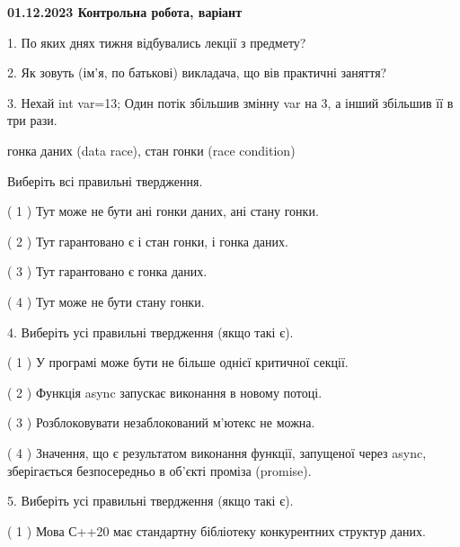 \documentclass[12pt, ukrainian]{article}
\begin{document}
\vspace{4mm}
\newpage
\begin {large}

\textbf{01.12.2023 Контрольна робота, варіант  }\par


{
1. По яких днях тижня відбувались лекції з предмету?



\vspace{5mm}
2. Як зовуть (ім'я, по батькові) викладача, що вів практичні заняття?



\vspace{5mm}
3. Нехай int var=13; Один потік збільшив змінну var на 3, а інший збільшив її в три рази.

гонка даних (data race), стан гонки (race condition)

Виберіть всі правильні твердження.\par
\vspace{2mm}
( 1 ) Тут може не бути ані гонки даних, ані стану гонки.%

( 2 ) Тут гарантовано є і стан гонки, і гонка даних.%

( 3 ) Тут гарантовано є гонка даних.%

( 4 ) Тут може не бути стану гонки.%


\vspace{5mm}
4. Виберіть усі правильні твердження (якщо такі є).\par
\vspace{2mm}

( 1 ) У програмі може бути не більше однієї критичної секції.%

( 2 ) Функція async запускає виконання в новому потоці.%

( 3 ) Розблоковувати незаблокований м’ютекс не можна.%

( 4 ) Значення, що є результатом виконання функції, запущеної через async, зберігається безпосередньо в об’єкті проміза (promise).%


\vspace{5mm}
5. Виберіть усі правильні твердження (якщо такі є).\par
\vspace{2mm}

( 1 ) Мова С++20 має стандартну бібліотеку конкурентних структур даних.%

}
\end{large}
\end{document}
